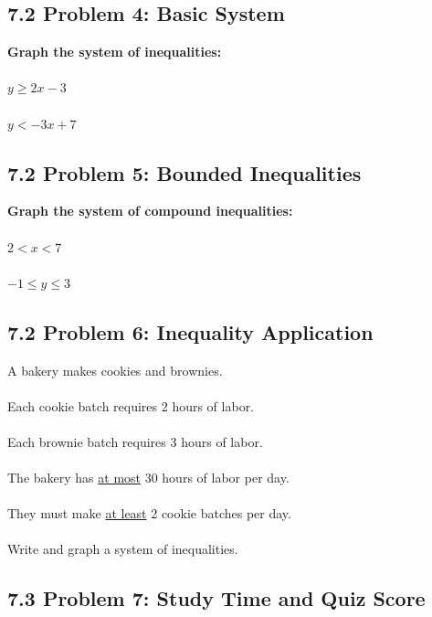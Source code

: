 \documentclass[12pt]{article}
\begin{document}
            \vspace{1cm}
        
    	\subsection*{7.2 Problem 4: Basic System}
		
            \textbf{Graph the system of inequalities:}\\\\
			$y \geq 2x - 3$\\\\
			$y < -3x + 7$

			\vspace{1cm}
	
	    \subsection*{7.2 Problem 5: Bounded Inequalities}
		
		    \textbf{Graph the system of compound inequalities:}\\\\
			$2 < x < 7$\\\\
			$-1 \leq y \leq 3$

            \vspace{1cm}
	
	    \subsection*{7.2 Problem 6: Inequality Application}
		
            A bakery makes cookies and brownies.\\\\
		    Each cookie batch requires 2 hours of labor.\\\\
		    Each brownie batch requires 3 hours of labor.\\\\
		    The bakery has \underline{at most} 30 hours of labor per day.\\\\
		    They must make \underline{at least} 2 cookie batches per day.\\\\
		    Write and graph a system of inequalities.

			\newpage
	
		\subsection*{7.3 Problem 7: Study Time and Quiz Score}
\end{document}
